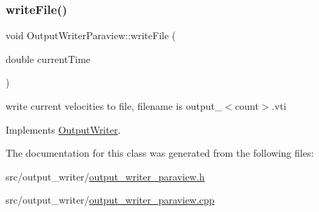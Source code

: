\subsubsection{\texorpdfstring{writeFile()}{writeFile()}}
{\footnotesize\ttfamily void Output\+Writer\+Paraview\+::write\+File (\begin{DoxyParamCaption}\item[{double}]{current\+Time }\end{DoxyParamCaption})\hspace{0.3cm}{\ttfamily [virtual]}}



write current velocities to file, filename is output\+\_\+$<$count$>$.\+vti 



Implements \mbox{\hyperlink{classOutputWriter_ac625c204affdc05919388a3549c2e945}{Output\+Writer}}.



The documentation for this class was generated from the following files\+:\begin{DoxyCompactItemize}
\item 
src/output\+\_\+writer/\mbox{\hyperlink{output__writer__paraview_8h}{output\+\_\+writer\+\_\+paraview.\+h}}\item 
src/output\+\_\+writer/\mbox{\hyperlink{output__writer__paraview_8cpp}{output\+\_\+writer\+\_\+paraview.\+cpp}}\end{DoxyCompactItemize}
